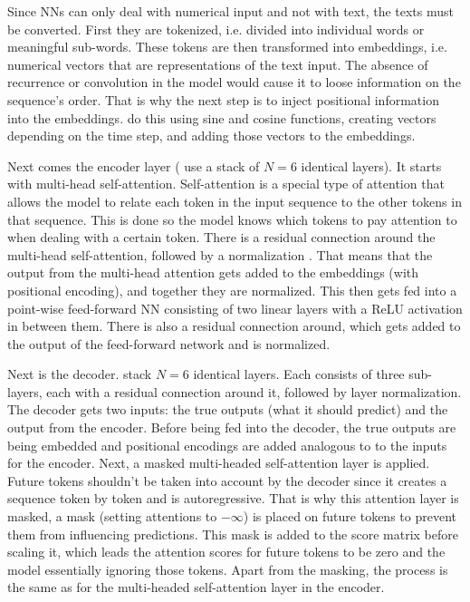 Since NNs can only deal with numerical input and not with text, the texts must be converted. First they are tokenized, i.e. divided into individual words or meaningful sub-words. These tokens are then transformed into embeddings, i.e. numerical vectors that are representations of the text input. The absence of recurrence or convolution in the model would cause it to loose information on the sequence's order. That is why the next step is to inject positional information into the embeddings. \citet{vaswani2017attention} do this using sine and cosine functions, creating vectors depending on the time step, and adding those vectors to the embeddings.

Next comes the encoder layer (\citet{vaswani2017attention} use a stack of $N=6$ identical layers). It starts with multi-head self-attention. Self-attention is a special type of attention that allows the model to relate each token in the input sequence to the other tokens in that sequence. This is done so the model knows which tokens to pay attention to when dealing with a certain token. There is a residual connection \citep{he2016deep} around the multi-head self-attention, followed by a normalization \citep{ba2016layer}. That means that the output from the multi-head attention gets added to the embeddings (with positional encoding), and together they are normalized. This then gets fed into a point-wise feed-forward NN consisting of two linear layers with a ReLU activation \citep{nair2010rectified} in between them. There is also a residual connection around, which gets added to the output of the feed-forward network and is normalized.

Next is the decoder. \citet{vaswani2017attention} stack $N=6$ identical layers. Each consists of three sub-layers, each with a residual connection around it, followed by layer normalization. The decoder gets two inputs: the true outputs (what it should predict) and the output from the encoder. Before being fed into the decoder, the true outputs are being embedded and positional encodings are added analogous to to the inputs for the encoder. Next, a masked multi-headed self-attention layer is applied. Future tokens shouldn't be taken into account by the decoder since it creates a sequence token by token and is autoregressive. That is why this attention layer is masked, a mask (setting attentions to $-\infty$) is placed on future tokens to prevent them from influencing predictions. This mask is added to the score matrix before scaling it, which leads the attention scores for future tokens to be zero and the model essentially ignoring those tokens. Apart from the masking, the process is the same as for the multi-headed self-attention layer in the encoder.

